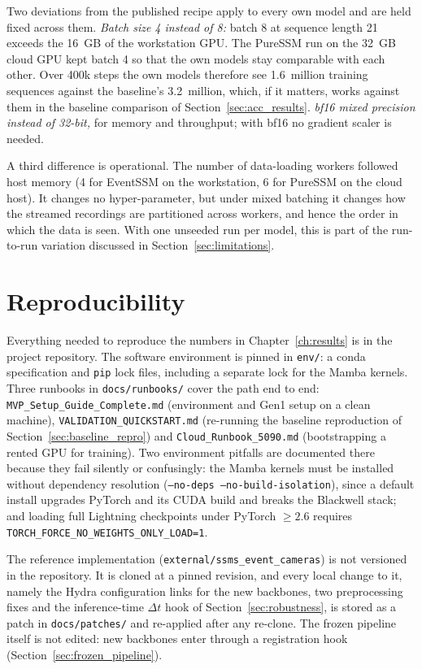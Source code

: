 \documentclass[11pt, a4paper]{report}
\begin{document}
Two deviations from the published recipe apply to every own model and are held fixed across them.
\emph{Batch size 4 instead of 8:} batch 8 at sequence length 21 exceeds the 16~GB of the workstation
GPU. The PureSSM run on the 32~GB cloud GPU kept batch 4 so that the own models stay comparable with
each other. Over 400k steps the own models therefore see 1.6~million training sequences against the
baseline's 3.2~million, which, if it matters, works against them in the baseline comparison of
Section~\ref{sec:acc_results}. \emph{bf16 mixed precision instead of 32-bit,} for memory and
throughput; with bf16 no gradient scaler is needed.

A third difference is operational. The number of data-loading workers followed host memory (4 for
EventSSM on the workstation, 6 for PureSSM on the cloud host). It changes no hyper-parameter, but under
mixed batching it changes how the streamed recordings are partitioned across workers, and hence the
order in which the data is seen. With one unseeded run per model, this is part of the run-to-run
variation discussed in Section~\ref{sec:limitations}.

\section{Reproducibility}
\label{sec:reproducibility}
Everything needed to reproduce the numbers in Chapter~\ref{ch:results} is in the project repository.
The software environment is pinned in \texttt{env/}: a conda specification and \texttt{pip} lock files,
including a separate lock for the Mamba kernels. Three runbooks in \texttt{docs/runbooks/} cover the
path end to end: \texttt{MVP\_Setup\_Guide\_Complete.md} (environment and Gen1 setup on a clean machine),
\texttt{VALIDATION\_QUICKSTART.md} (re-running the baseline reproduction of
Section~\ref{sec:baseline_repro}) and \texttt{Cloud\_Runbook\_5090.md} (bootstrapping a rented GPU for
training). Two environment pitfalls are documented there because they fail silently or confusingly: the
Mamba kernels must be installed without dependency resolution (\texttt{--no-deps
--no-build-isolation}), since a default install upgrades PyTorch and its CUDA build and breaks the
Blackwell stack; and loading full Lightning checkpoints under PyTorch $\geq 2.6$ requires
\texttt{TORCH\_FORCE\_NO\_WEIGHTS\_ONLY\_LOAD=1}.

The reference implementation (\texttt{external/ssms\_event\_cameras}) is not versioned in the
repository. It is cloned at a pinned revision, and every local change to it, namely the Hydra
configuration links for the new backbones, two preprocessing fixes and the inference-time $\Delta t$
hook of Section~\ref{sec:robustness}, is stored as a patch in \texttt{docs/patches/} and re-applied after
any re-clone. The frozen pipeline itself is not edited: new backbones enter through a registration hook
(Section~\ref{sec:frozen_pipeline}).
\end{document}
